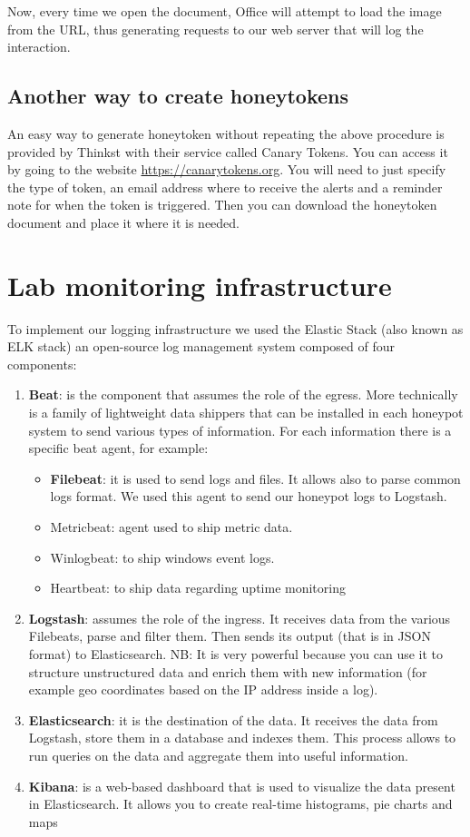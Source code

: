 \documentclass[epsfig,a4paper,11pt,titlepage,oneside,openany]{book}
\begin{document}
Now, every time we open the document, Office will attempt to load the image from the URL, thus generating requests to our web server that will log the interaction.


\section{Another way to create honeytokens}
An easy way to generate honeytoken without repeating the above procedure is provided by Thinkst with their service called Canary Tokens. You can access it by going to the website \url{https://canarytokens.org}. You will need to just specify the type of token, an email address where to receive the alerts and a reminder note for when the token is triggered. Then you can download the honeytoken document and place it where it is needed.


\chapter{Lab monitoring infrastructure}

To implement our logging infrastructure we used the Elastic Stack (also known as ELK stack) an open-source log management system composed of four components:
\begin{enumerate}
\item \textbf{Beat}: is the component that assumes the role of the egress. More technically is a family of lightweight data shippers that can be installed in each honeypot system to send various types of information. For each information there is a specific beat agent, for example:
	\begin{itemize}
	\item \textbf{Filebeat}: it is used to send logs and files. It allows also to parse common logs format. We used this agent to send our honeypot logs to Logstash.
	\item Metricbeat: agent used to ship metric data.
	\item Winlogbeat: to ship windows event logs.
	\item Heartbeat: to ship data regarding uptime monitoring
	\end{itemize}
\item \textbf{Logstash}: assumes the role of the ingress. It receives data from the various Filebeats, parse and filter them. Then sends its output (that is in JSON format) to Elasticsearch. NB: It is very powerful because you can use it to structure unstructured data and enrich them with new information (for example geo coordinates based on the IP address inside a log).
\item \textbf{Elasticsearch}: it is the destination of the data. It receives the data from Logstash, store them  in a database and indexes them. This process allows to run queries on the data and aggregate them into useful information. 
\item \textbf{Kibana}: is a web-based dashboard that is used to visualize the data present in Elasticsearch. It allows you to create real-time histograms, pie charts and maps
\end{enumerate}
\end{document}
